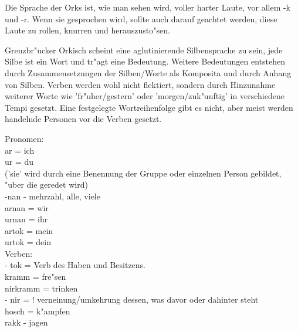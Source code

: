\documentclass[a5paper,8pt]{book}
\begin{document}
Die Sprache der Orks ist, wie man sehen wird, voller harter Laute, vor allem -k und -r. Wenn sie gesprochen wird, sollte auch darauf geachtet werden, diese Laute zu rollen, knurren und herauszusto"sen. 

Grenzbr"ucker Orkisch scheint eine aglutinierende Silbensprache zu sein, jede Silbe ist ein Wort und  tr"agt  eine Bedeutung. Weitere Bedeutungen entstehen durch Zusammensetzungen der Silben/Worte als Komposita und durch Anhang von Silben. Verben werden wohl nicht flektiert, sondern durch Hinzunahme weiterer Worte wie 'fr"uher/gestern' oder 'morgen/zuk"unftig' in verschiedene Tempi gesetzt. Eine festgelegte Wortreihenfolge gibt es nicht, aber meist werden handelnde Personen vor die Verben gesetzt. 

\newpage

\noindent Pronomen:\\

\noindent ar =  ich \\
ur = du \\

('sie' wird durch eine Benennung der Gruppe oder einzelnen Person gebildet, "uber die geredet wird)\\

\noindent -nan - mehrzahl, alle, viele \\
arnan = wir \\
urnan = ihr \\

\noindent artok = mein \\
urtok = dein \\
\newpage
\noindent Verben:\\

\noindent - tok = Verb des Haben und Besitzens.\\

\noindent kramm = fre"sen \\
nirkramm = trinken \\

\noindent - nir =  ! verneinung/umkehrung dessen, was davor oder dahinter steht\\

\noindent hosch = k"ampfen \\
rakk - jagen \\

\newpage
\end{document}
